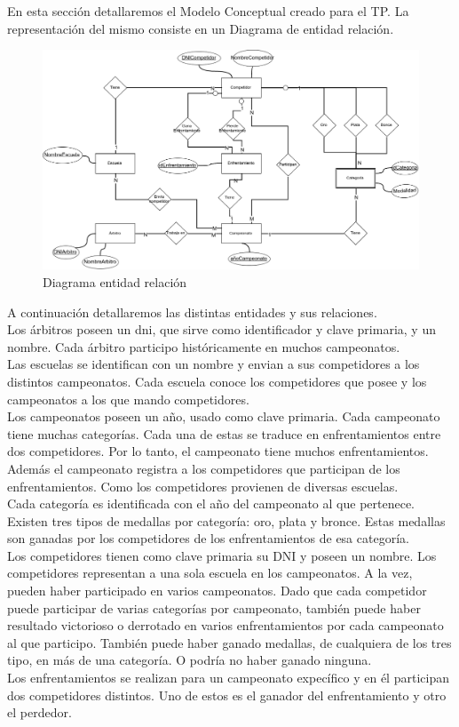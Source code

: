 En esta sección detallaremos el Modelo Conceptual creado para el TP. La representación del mismo consiste en un Diagrama
de entidad relación.

\begin{figure}[H]
  \centering
    \includegraphics[scale=0.4]{imagenes/DER.png}
  \caption{Diagrama entidad relación}
\end{figure}

A continuación detallaremos las distintas entidades y sus relaciones.\\

Los árbitros poseen un dni, que sirve como identificador y clave primaria, y un nombre. Cada árbitro participo históricamente
en muchos campeonatos.\\

Las escuelas se identifican con un nombre y envian a sus competidores a los distintos campeonatos. Cada escuela conoce los competidores
que posee y los campeonatos a los que mando competidores.\\

Los campeonatos poseen un año, usado como clave primaria. Cada campeonato tiene muchas categorías. Cada una de estas se
traduce en enfrentamientos entre dos competidores. Por lo tanto, el campeonato tiene muchos enfrentamientos. Además
el campeonato registra a los competidores que participan de los enfrentamientos. Como los competidores provienen de
diversas escuelas.\\

Cada categoría es identificada con el año del campeonato al que pertenece. Existen tres tipos de medallas por categoría:
oro, plata y bronce. Estas medallas son ganadas por los competidores de los enfrentamientos de esa categoría.\\

Los competidores tienen como clave primaria su DNI y poseen un nombre. Los competidores representan a una sola escuela en
los campeonatos. A la vez, pueden haber participado en varios campeonatos. Dado que cada competidor puede participar
de varias categorías por campeonato, también puede haber resultado victorioso o derrotado en varios enfrentamientos por
cada campeonato al que participo. También puede haber ganado medallas, de cualquiera de los tres tipo, en más de una categoría.
O podría no haber ganado ninguna.\\

Los enfrentamientos se realizan para un campeonato expecífico y en él participan dos competidores distintos. Uno de estos
es el ganador del enfrentamiento y otro el perdedor.
